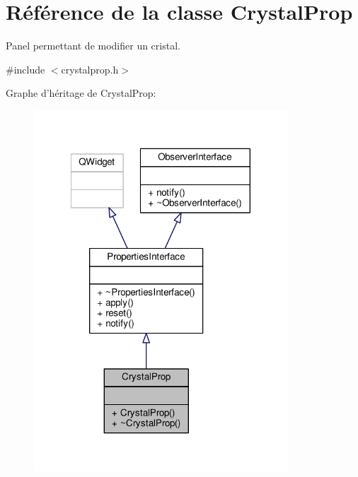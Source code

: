 \hypertarget{classCrystalProp}{\section{Référence de la classe Crystal\+Prop}
\label{classCrystalProp}
}


Panel permettant de modifier un cristal.  




{\ttfamily \#include $<$crystalprop.\+h$>$}



Graphe d'héritage de Crystal\+Prop\+:\nopagebreak
\begin{figure}[H]
\begin{center}
\leavevmode
\includegraphics[width=269pt]{d8/d57/classCrystalProp__inherit__graph}
\end{center}
\end{figure}


